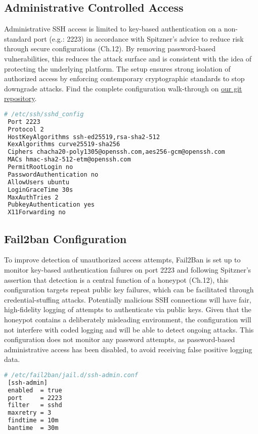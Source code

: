 \documentclass{cls/ULBreport}
\begin{document}
        \subsection{Administrative Controlled Access}
    Administrative SSH access is limited to key-based authentication on a non-standard port (e.g.: 2223) in accordance with Spitzner's advice to reduce risk through secure configurations (Ch.12). By removing password-based vulnerabilities, this reduces the attack surface and is consistent with the idea of protecting the underlying platform. The setup ensures strong isolation of authorized access by enforcing contemporary cryptographic standards to stop downgrade attacks. Find the complete configuration walk-through on \href{https://github.com/nottoBD/netsec-cowrie-honey}{our git repository}.        
        \begin{lstlisting}[language=bash,caption={Securing Legitimate Access}]
 # /etc/ssh/sshd_config
 Port 2223
 Protocol 2
 HostKeyAlgorithms ssh-ed25519,rsa-sha2-512
 KexAlgorithms curve25519-sha256
 Ciphers chacha20-poly1305@openssh.com,aes256-gcm@openssh.com
 MACs hmac-sha2-512-etm@openssh.com
 PermitRootLogin no
 PasswordAuthentication no
 AllowUsers ubuntu
 LoginGraceTime 30s
 MaxAuthTries 2
 PubkeyAuthentication yes
 X11Forwarding no
        \end{lstlisting}
        
        
        \subsection{Fail2ban Configuration} To improve detection of unauthorized access attempts, Fail2Ban is set up to monitor key-based authentication failures on port 2223 and following Spitzner's assertion that detection is a central function of a honeypot (Ch.12), this configuration targets repeat public key failures, which can be facilitated through credential-stuffing attacks. Potentially malicious SSH connections will have fair, high-fidelity logging of attempts to authenticate via public keys. Given that the honeypot contains a deliberately misleading environment, the configuration will not interfere with coded logging and will be able to detect ongoing attacks. This configuration does not monitor any password attempts, as password-based administrative access has been disabled, to avoid receiving false positive logging data.
        
        \begin{lstlisting}[language=bash,caption={Custom Jail Rules}]
 # /etc/fail2ban/jail.d/ssh-admin.conf
 [ssh-admin]
 enabled  = true
 port     = 2223
 filter   = sshd
 maxretry = 3  
 findtime = 10m
 bantime  = 30m
        \end{lstlisting}
        
\end{document}
